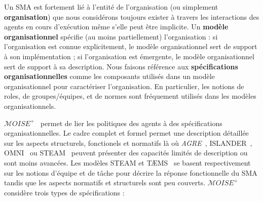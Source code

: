 \documentclass[contribution]{jfsma}
\begin{document}
Un SMA est fortement lié à l'entité de l'organisation (ou simplement \textbf{organisation}) que nous considérons toujours exister à travers les interactions des agents en cours d'exécution même s'elle peut être implicite.
%
%
Un \textbf{modèle organisationnel} spécifie (au moins partiellement) l'organisation : si l'organisation est connue explicitement, le modèle organisationnel sert de support à son implémentation ; si l'organisation est émergente, le modèle organisationnel sert de support à sa description. Nous faisons référence aux \textbf{spécifications organisationnelles} comme les composants utilisés dans un modèle organisationnel pour caractériser l'organisation.
En particulier, les notions de roles, de groupes/équipes, et de normes sont fréquement utilisés dans les modèles organisationnels.

% 


$\mathcal{M}OISE^+$~\cite{Hubner2007} permet de lier les politiques des agents à des spécifications organisationnelles. %
Le cadre complet et formel permet une description détaillée sur les aspects structurels, fonctionels et normatifs là où \emph{AGRE}~\cite{Ferber2004}, ISLANDER~\cite{Esteva2002}, OMNI~\cite{Dignum2005} ou STEAM~\cite{Tambe1999} peuvent présenter des capacités limités de description ou sont moins avancées.
Les modèles STEAM et TÆMS~\cite{Vincent2000} se basent respectivement sur les notions d'équipe et de tâche pour décrire la réponse fonctionnelle du SMA tandis que les aspects normatifs et structurels sont peu couverts.
$\mathcal{M}OISE^+$ considère trois types de spécifications :
\end{document}
